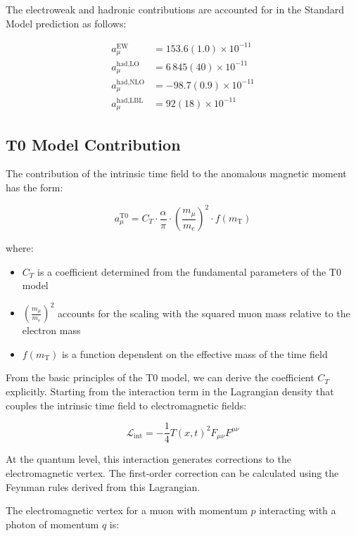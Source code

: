 \documentclass[12pt,a4paper]{article}
\begin{document}
	The electroweak and hadronic contributions are accounted for in the Standard Model prediction as follows:
	
	\begin{align}
		a_\mu^{\text{EW}} &= 153.6(1.0) \times 10^{-11}\\
		a_\mu^{\text{had,LO}} &= 6\,845(40) \times 10^{-11}\\
		a_\mu^{\text{had,NLO}} &= -98.7(0.9) \times 10^{-11}\\
		a_\mu^{\text{had,LBL}} &= 92(18) \times 10^{-11}
	\end{align}
	
	\subsection{T0 Model Contribution}
	
	The contribution of the intrinsic time field to the anomalous magnetic moment has the form:
	
	\begin{equation}
		a_\mu^{\text{T0}} = C_T \cdot \frac{\alpha}{\pi} \cdot \left(\frac{m_\mu}{m_e}\right)^2 \cdot f(m_{\text{T}})
	\end{equation}
	
	where:
	\begin{itemize}
		\item $C_T$ is a coefficient determined from the fundamental parameters of the T0 model
		\item $\left(\frac{m_\mu}{m_e}\right)^2$ accounts for the scaling with the squared muon mass relative to the electron mass
		\item $f(m_{\text{T}})$ is a function dependent on the effective mass of the time field
	\end{itemize}
	
	From the basic principles of the T0 model, we can derive the coefficient $C_T$ explicitly. Starting from the interaction term in the Lagrangian density that couples the intrinsic time field to electromagnetic fields:
	
	\begin{equation}
		\mathcal{L}_{\text{int}} = -\frac{1}{4}T(x,t)^2 F_{\mu\nu}F^{\mu\nu}
	\end{equation}
	
	At the quantum level, this interaction generates corrections to the electromagnetic vertex. The first-order correction can be calculated using the Feynman rules derived from this Lagrangian.
	
	The electromagnetic vertex for a muon with momentum $p$ interacting with a photon of momentum $q$ is:
	
\end{document}

